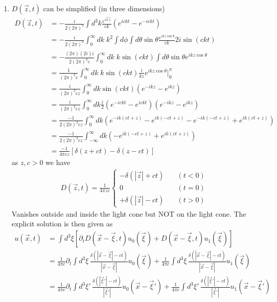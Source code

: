 \documentclass[10pt,a4paper]{book}
\theoremstyle{definition}
\begin{document}
\begin{itemize}
\begin{enumerate}
\item $D(\vec{z},t)$ can be simplified (in three dimensions)
\begin{align}
D(\vec{z},t)&=-\frac{i}{2(2\pi)^3}\int d^3k\frac{e^{i\vec{k}\vec{z}}}{ck}(e^{ickt}-e^{-ickt})\\
&=-\frac{i}{2(2\pi)^3}\int_0^\infty dk\;k^2\int d\phi\int d\theta\sin\theta\frac{e^{ikz\cos\theta}}{ck}2i\sin(ckt)\\
&=-\frac{(2\pi)(2i)i}{2(2\pi)^3c}\int_0^\infty dk\;k\sin(ckt)\int d\theta\sin\theta e^{ikz\cos\theta}\\
&=\frac{1}{(2\pi)^2c}\int_0^\infty dk\;k\sin(ckt)\frac{i}{kz}e^{ikz\cos\theta}|_0^\pi\\
&=\frac{i}{(2\pi)^2cz}\int_0^\infty dk\sin(ckt)\left(e^{-ikz}-e^{ikz}\right)\\
&=\frac{i}{(2\pi)^2cz}\int_0^\infty dk\frac{i}{2}(e^{-ickt}-e^{ickt})\left(e^{-ikz}-e^{ikz}\right)\\
&=\frac{-1}{2(2\pi)^2cz}\int_0^\infty dk(e^{-ik(ct+z)}-e^{ik(-ct+z)}-e^{-ik(-ct+z)}+e^{ik(ct+z)})\\
&=\frac{-1}{2(2\pi)^2cz}\int_{-\infty}^\infty dk(-e^{ik(-ct+z)}+e^{ik(ct+z)})\\
&=\frac{-1}{4\pi cz}\left[\delta(z+ct)-\delta(z-ct)\right]
\end{align}
as $z,c>0$ we have
\begin{align}
D(\vec{z},t)=\frac{1}{4\pi z c}\left\{\begin{matrix}
-\delta(|\vec{z}|+ct)&\quad(t<0) \\  
0&\quad(t=0)\\
+\delta(|\vec{z}|-ct) &\quad(t>0)
\end{matrix}
\right.
\end{align}
Vanishes outside and inside the light cone but NOT on the light cone. The explicit solution is then given as 
\begin{align}
u(\vec{x},t)
&=\int d^3\xi\left[ \partial_t D(\vec{x}-\vec{\xi},t)u_0(\vec{\xi})+D(\vec{x}-\vec{\xi},t)u_1(\vec{\xi})\right]\\
&=\frac{1}{4\pi c}\partial_t\int d^3\xi\,\frac{\delta(|\vec{x}-\vec{\xi}|-ct)}{|\vec{x}-\vec{\xi}|}u_0(\vec{\xi})+\frac{1}{4\pi c}\int d^3\xi\,\frac{\delta(|\vec{x}-\vec{\xi}|-ct)}{|\vec{x}-\vec{\xi}|}u_1(\vec{\xi})\\
&=\frac{1}{4\pi c}\partial_t\int d^3\xi'\,\frac{\delta(|\vec{\xi}'|-ct)}{|\vec{\xi}'|}u_0(\vec{x}-\vec{\xi}')+\frac{1}{4\pi c}\int d^3\xi'\,\frac{\delta(|\vec{\xi}'|-ct)}{|\vec{\xi}'|}u_1(\vec{x}-\vec{\xi}')\\

\end{align}
\end{enumerate}
\end{itemize}
\end{document}
